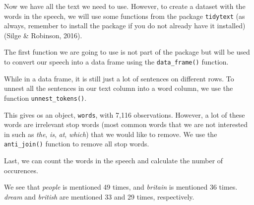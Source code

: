 \documentclass[12pt,oneside]{reedthesis}
\theoremstyle{definition}
\theoremstyle{definition}
\theoremstyle{definition}
\theoremstyle{remark}
\begin{document}
  Now we have all the text we need to use. However, to create a dataset
  with the words in the speech, we will use some functions from the
  package \texttt{tidytext} (as always, remember to install the package if
  you do not already have it installed) (Silge \& Robinson, 2016).
  \begin{Shaded}
  \begin{Highlighting}[]
  \NormalTok{(}\NormalTok{)}
  \end{Highlighting}
  \end{Shaded}
  The first function we are going to use is not part of the package but
  will be used to convert our speech into a data frame using the
  \texttt{data\_frame()} function.
  \begin{Shaded}
  \begin{Highlighting}[]
  \StringTok{ }\NormalTok{(}
  \end{Highlighting}
  \end{Shaded}
  While in a data frame, it is still just a lot of sentences on different
  rows. To unnest all the sentences in our text column into a word column,
  we use the function \texttt{unnest\_tokens()}.
  \begin{Shaded}
  \end{Shaded}
  This gives os an object, \texttt{words}, with 7,116 observations.
  However, a lot of these words are irrelevant stop words (most common
  words that we are not interested in such as \emph{the}, \emph{is},
  \emph{at}, \emph{which}) that we would like to remove. We use the
  \texttt{anti\_join()} function to remove all stop words.
  \begin{Shaded}
  \end{Shaded}
  Last, we can count the words in the speech and calculate the number of
  occurences.
  \begin{Shaded}
  \end{Shaded}
  We see that \emph{people} is mentioned 49 times, and \emph{britain} is
  mentioned 36 times. \emph{dream} and \emph{british} are mentioned 33 and
  29 times, respectively.
  
\end{document}
